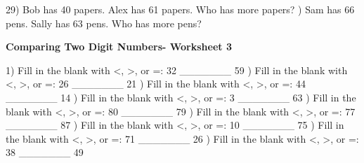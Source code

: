 \documentclass{article}%
\begin{document}
29) Bob has 40 papers. Alex has 61 papers. Who has more papers?%
\newline%
\newline%
) Sam has 66 pens. Sally has 63 pens. Who has more pens?%
\newline%
\newline%
\newline%
\pagebreak%
\large%
\begin{center}%
\textbf{Comparing Two Digit Numbers- Worksheet 3}%
\newline%
\newline%
\newline%
\end{center} \normalsize%
1) Fill in the blank with <, >, or =: 32 \_\_\_\_\_\_\_ 59%
\newline%
\newline%
) Fill in the blank with <, >, or =: 26 \_\_\_\_\_\_\_ 21%
\newline%
\newline%
) Fill in the blank with <, >, or =: 44 \_\_\_\_\_\_\_ 14%
\newline%
\newline%
) Fill in the blank with <, >, or =: 3 \_\_\_\_\_\_\_ 63%
\newline%
\newline%
) Fill in the blank with <, >, or =: 80 \_\_\_\_\_\_\_ 79%
\newline%
\newline%
) Fill in the blank with <, >, or =: 77 \_\_\_\_\_\_\_ 87%
\newline%
\newline%
) Fill in the blank with <, >, or =: 10 \_\_\_\_\_\_\_ 75%
\newline%
\newline%
) Fill in the blank with <, >, or =: 71 \_\_\_\_\_\_\_ 26%
\newline%
\newline%
) Fill in the blank with <, >, or =: 38 \_\_\_\_\_\_\_ 49%
\newline%
\newline%
\end{document}
